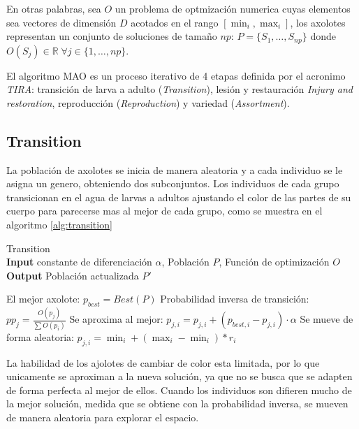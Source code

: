  En otras palabras, sea $O$ un problema de optmización numerica cuyas elementos sea vectores de dimensión $D$ acotados en el rango $[\min_i, \max_i]$, los axolotes representan un conjunto de soluciones de tamaño $np$: $P = \{ S_1, \dots, S_{np} \}$ donde $O(S_j) \in \mathbb{R} \; \forall j \in \{1, \dots,  np\}$.
 
 El algoritmo MAO es un proceso iterativo de 4 etapas definida por el acronimo \textit{TIRA}: transición de larva a adulto (\textit{Transition}), lesión y restauración \textit{Injury and restoration}, reproducción (\textit{Reproduction}) y variedad (\textit{Assortment}).
 
 \subsection{Transition}
 
 La población de axolotes se inicia de manera aleatoria y a cada individuo se le asigna un genero, obteniendo dos subconjuntos. Los individuos de cada grupo transicionan en el agua de larvas a adultos ajustando el color de las partes de su cuerpo para parecerse mas al mejor de cada grupo, como se muestra en el algoritmo \ref{alg:transition}
 
 \begin{algorithm}
 	\caption{Transition \\
 	\textbf{Input} constante de diferenciación $\alpha$, Población $P$, Función de optimización $O$ \\
 	\textbf{Output}  Población actualizada $P'$} 
 	\begin{algorithmic}[1]
 		\State El mejor axolote: $p_{best} = Best(P)$
 			\State Probabilidad inversa de transición: $pp_j = \frac{O(p_j)}{\sum O(p_i)}$
 				\State Se aproxima al mejor: $p_{j,i} = p_{j,i} + (p_{best, i} - p_{j,i}) \cdot \alpha $
 			\Else
 				\State Se mueve de forma aleatoria: $p_{j,i} = \min_i + (\max_i - \min_i) * r_i$
 			\EndIf
 		\EndFor 
 	\end{algorithmic}
 	\label{alg:transition}
 \end{algorithm}
 
 La habilidad de los ajolotes de cambiar de color esta limitada, por lo que unicamente se aproximan a la nueva solución, ya que no se busca que se adapten de forma perfecta al mejor de ellos. Cuando los individuos son difieren mucho de la mejor solución, medida que se obtiene con la probabilidad inversa, se mueven de manera aleatoria para explorar el espacio.
 
